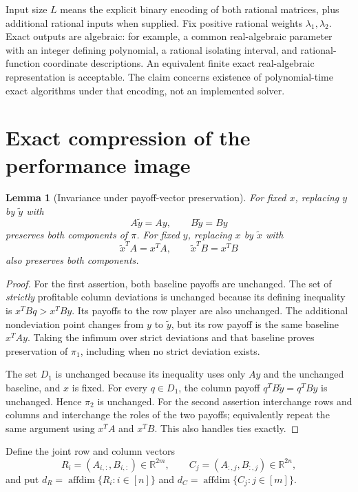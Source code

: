 \documentclass[11pt]{article}
\newtheorem{lemma}[theorem]{Lemma}
\theoremstyle{remark}
\newcommand{\R}{\mathbb R}
\newcommand{\affdim}{\operatorname{affdim}}
\begin{document}
Input size $L$ means the explicit binary encoding of both rational matrices, plus additional rational inputs when supplied. Fix positive rational weights $\lambda_1,\lambda_2$. Exact outputs are algebraic: for example, a common real-algebraic parameter with an integer defining polynomial, a rational isolating interval, and rational-function coordinate descriptions. An equivalent finite exact real-algebraic representation is acceptable. The claim concerns existence of polynomial-time exact algorithms under that encoding, not an implemented solver.

\section{Exact compression of the performance image}
\begin{lemma}[Invariance under payoff-vector preservation]\label{lem:invariance}
For fixed $x$, replacing $y$ by $\widetilde y$ with
\[
 A\widetilde y=Ay,\qquad B\widetilde y=By
\]
preserves both components of $\pi$. For fixed $y$, replacing $x$ by $\widetilde x$ with
\[
 \widetilde x^TA=x^TA,\qquad \widetilde x^TB=x^TB
\]
also preserves both components.
\end{lemma}
\begin{proof}
For the first assertion, both baseline payoffs are unchanged. The set of \emph{strictly} profitable column deviations is unchanged because its defining inequality is $x^TBq>x^TBy$. Its payoffs to the row player are also unchanged. The additional nondeviation point changes from $y$ to $\widetilde y$, but its row payoff is the same baseline $x^TAy$. Taking the infimum over strict deviations and that baseline proves preservation of $\pi_1$, including when no strict deviation exists.

The set $D_1$ is unchanged because its inequality uses only $Ay$ and the unchanged baseline, and $x$ is fixed. For every $q\in D_1$, the column payoff $q^TB\widetilde y=q^TBy$ is unchanged. Hence $\pi_2$ is unchanged. For the second assertion interchange rows and columns and interchange the roles of the two payoffs; equivalently repeat the same argument using $x^TA$ and $x^TB$. This also handles ties exactly.
\end{proof}

Define the joint row and column vectors
\[
 R_i=(A_{i,:},B_{i,:})\in\R^{2m},\qquad
 C_j=(A_{:,j},B_{:,j})\in\R^{2n},
\]
and put $d_R=\affdim\{R_i:i\in[n]\}$ and $d_C=\affdim\{C_j:j\in[m]\}$.
\end{document}
